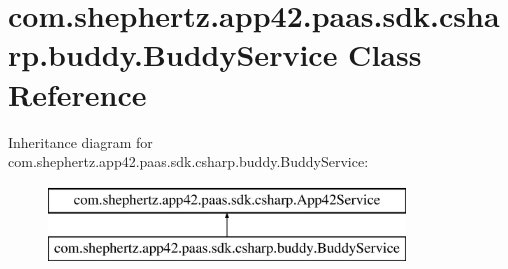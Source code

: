 \hypertarget{classcom_1_1shephertz_1_1app42_1_1paas_1_1sdk_1_1csharp_1_1buddy_1_1_buddy_service}{\section{com.\+shephertz.\+app42.\+paas.\+sdk.\+csharp.\+buddy.\+Buddy\+Service Class Reference}
\label{classcom_1_1shephertz_1_1app42_1_1paas_1_1sdk_1_1csharp_1_1buddy_1_1_buddy_service}
}
Inheritance diagram for com.\+shephertz.\+app42.\+paas.\+sdk.\+csharp.\+buddy.\+Buddy\+Service\+:\begin{figure}[H]
\begin{center}
\leavevmode
\includegraphics[height=2.000000cm]{classcom_1_1shephertz_1_1app42_1_1paas_1_1sdk_1_1csharp_1_1buddy_1_1_buddy_service}
\end{center}
\end{figure}
